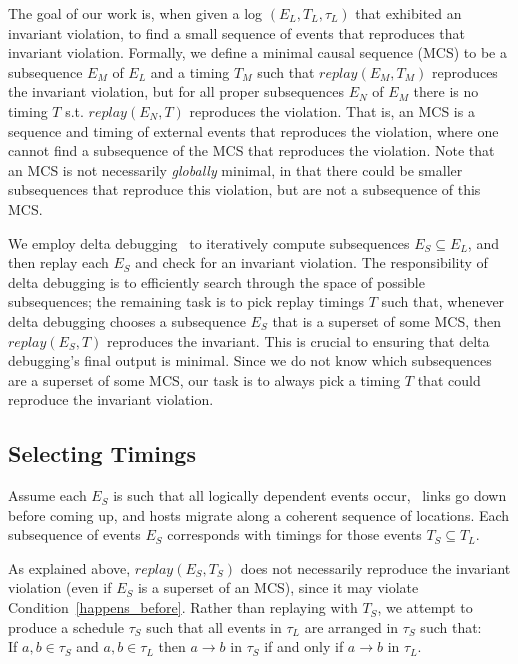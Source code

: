 The goal of our work is, when given a log $(E_L, T_L, \tau_L)$ that exhibited an
invariant violation, to find a small sequence of events that reproduces that
invariant violation. Formally, we define a minimal causal sequence (MCS)
to be a subsequence $E_M$
of $E_L$ and a timing $T_M$ such
that $replay(E_M,T_M)$ reproduces the invariant violation, but for all proper
subsequences $E_N$ of $E_M$
there is no timing $T$ s.t. $replay(E_N,T)$ reproduces the violation.
That is, an MCS is a sequence and timing of external events that reproduces the violation,
where one cannot find a subsequence of the MCS that reproduces the violation.
Note that an MCS is not necessarily {\em globally} minimal, in that there could be smaller
subsequences that reproduce this violation, but are not a subsequence of this MCS.

We employ delta debugging~\cite{Zeller:1999:YMP:318773.318946}
to iteratively compute
subsequences $E_S\subseteq E_L$, and then replay each $E_S$ and check for an
invariant violation. The responsibility of delta debugging is to efficiently
search through the space of possible subsequences; the remaining task is to
pick replay timings $T$ such that, whenever delta debugging chooses a
subsequence $E_S$ that is a superset of some MCS, then $replay(E_S, T)$
reproduces the invariant. This is crucial to ensuring that delta debugging's
final output is minimal. Since we do not know which subsequences are a
superset of some MCS, our task is to always pick a timing $T$ that
could reproduce the invariant violation.

\subsection{Selecting Timings}

Assume each $E_S$ is such
that all logically dependent events occur, \eg~links go down before coming up,
and hosts migrate along a coherent sequence of locations. Each subsequence of events $E_S$ corresponds with
timings for those events $T_S\subseteq T_L$.

As explained
above, $replay(E_S, T_S)$ does not necessarily reproduce the
invariant violation (even if $E_S$ is a superset of an MCS), since it may
violate Condition~\ref{happens_before}. Rather than replaying with $T_S$, we attempt to produce a
schedule $\tau_S$ such that all events in $\tau_L$ are arranged in $\tau_S$
such that: \\

If $a, b\in \tau_S$ and $a, b\in \tau_L$ then $a \rightarrow b$ in $\tau_S$ if
and only if $a \rightarrow b$ in $\tau_L$. \\

